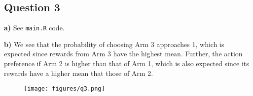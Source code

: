 \documentclass[a4paper,12pt]{article}
\def\code#1{\texttt{#1}}
\begin{document}
\subsection*{Question 3}

\textbf{a)} See \code{main.R} code.

\textbf{b)} We see that the probability of choosing Arm 3 approaches 1, which is expected 
since rewards from Arm 3 have the highest mean. Further, the action preference if Arm 2 
is higher than that of Arm 1, which is also expected since its rewards have a higher mean
 that those of Arm 2.

\begin{figure}[H]
  \centering
  \texttt{[image: figures/q3.png]}
\end{figure}
\end{document}
